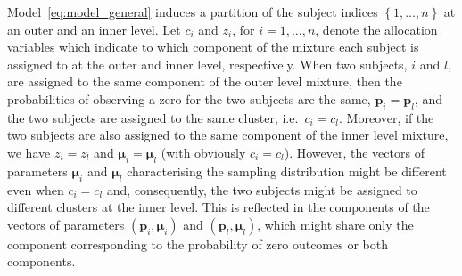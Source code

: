 \documentclass[11pt]{article}
\begin{document}
Model~\eqref{eq:model_general} induces a partition of the subject indices $\left\{ 1, \dots, n \right\}$ at an outer and an inner level. Let  $c_i$ and $z_i$, for $i=1,\ldots,n$, denote the allocation variables which  indicate to which component of the mixture each subject is assigned to at the outer and inner level, respectively.  When two subjects, $i$ and $l$, are assigned to the same component of the outer level mixture, then the probabilities of observing a zero for the two subjects are the same, $\bm p_i = \bm p_l$, and the two subjects are assigned to the same cluster, i.e.\ $c_i=c_l$. Moreover, if the two subjects are also assigned to the same component of the inner level mixture, we have $z_i=z_l$ and $\bm \mu_i = \bm \mu_l$ (with obviously $c_i=c_l$). However, the vectors of parameters $\bm \mu_i$ and $\bm \mu_l$  characterising the sampling distribution might be different even when $c_i=c_l$ and, consequently, the two subjects might be assigned to different clusters at the inner level. This is reflected in the components of the vectors of parameters $\left(\bm p_i, \bm \mu_i\right)$ and $\left(\bm p_l, \bm \mu_l\right)$, which might share only the component corresponding to the probability of zero outcomes or both components. 
\end{document}
